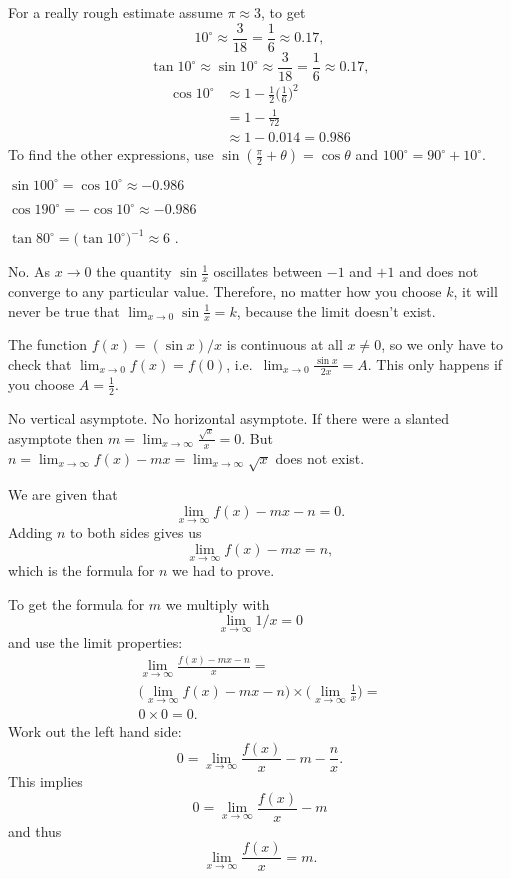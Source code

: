 For a really rough estimate assume $\pi\approx3$, to get
\[
10^\circ \approx \frac{3}{18} = \frac{1}{6} \approx 0.17,
\]
\[
\tan 10^\circ \approx \sin 10^\circ \approx \frac{3}{18} = \frac{1}{6} \approx
0.17,
\]
\begin{align*}
  \cos 10^\circ &\approx 1 - \frac{1}{2} \bigl(\frac{1}{6}\bigr)^2\\
  &= 1- \frac{1}{72}\\
  &\approx 1-0.014 = 0.986
\end{align*}
To find the other expressions, use $\sin(\frac\pi2+\theta) =
\cos\theta$ and $100^\circ = 90^\circ + 10 ^\circ$.

$\sin 100^\circ = \cos10^\circ \approx -0.986 $

$\cos 190^\circ = -\cos 10^\circ \approx -0.986$

$\tan80^\circ = \bigl(\tan 10^\circ\bigr)^{-1} \approx 6$ .
\bigskip

\item[{\bfseries(III16.29)}]

No.  As \(x\to0\) the quantity \(\sin \frac{1}{x}\) oscillates
between \(-1\) and \(+1\) and does not converge to any particular
value.  Therefore, no matter how you choose \(k\), it will never be
true that \(\lim_{x\to 0} \sin \frac1x = k\), because the limit
doesn't exist.
\bigskip

\item[{\bfseries(III16.30)}]

The function \(f(x) = (\sin x)/x\) is continuous at all \(x\ne 0\),
so we only have to check that \(\lim_{x\to0} f(x) = f(0)\), i.e.\
\(\lim_{x\to0}\frac{\sin x}{2x} = A\).  This only happens if you
choose \(A=\frac12\).
\bigskip

\item[{\bfseries(III18.2a)}]

No vertical asymptote.
No horizontal asymptote.
If there were a slanted asymptote then $m =
\lim_{x\to\infty}\frac{\sqrt{x}}{x} = 0$. But $n = \lim_{x\to\infty}
f(x) - mx = \lim_{x\to\infty}\sqrt{x}$ does not exist.
\bigskip

\item[{\bfseries(III18.5)}]

We are given that
\[
\lim_{x\to\infty} f(x) - mx-n = 0.
\]
Adding $n$ to both sides gives us
\[
\lim_{x\to\infty} f(x) -mx = n,
\]
which is the formula for $n$ we had to prove.

To get the formula for $m$ we multiply with
\[
\lim_{x\to\infty} 1/x =
0
\]
and use the limit properties:
\begin{multline*}
  \lim_{x\to\infty} \frac{f(x)-mx-n}{x} = \\
  \bigl(\lim_{x\to\infty} f(x)-mx-n\bigr)\times
  \bigl(\lim_{x\to\infty}\frac{1}{x}\bigr)=\\
  0\times0 = 0.
\end{multline*}
Work out the left hand side:
\[
0 = \lim_{x\to\infty} \frac{f(x)}{x} - m - \frac{n}{x}.
\]
This implies
\[
0 = \lim_{x\to\infty} \frac{f(x)}{x} - m
\]
and thus
\[
\lim_{x\to\infty} \frac{f(x)}{x} = m.
\]

